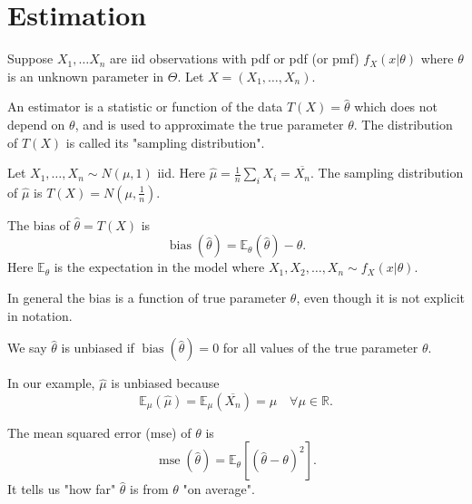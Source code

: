 \documentclass[a4paper]{scrartcl}
\begin{document}
\section{Estimation}
Suppose $X_1 , \ldots X_n$ are iid observations with pdf or pdf (or pmf) $f_{X}(x| \theta)$ where $\theta$ is an unknown parameter in $\Theta$. Let $X=(X_1 , \ldots , X_{n})$. 
\begin{definition*}[Estimator]
     An estimator is a statistic or function of the data $T (X)=\hat{\theta}$ which does not depend on $\theta$, and is used to approximate the true parameter $\theta$. The distribution of $T (X)$ is called its "sampling distribution". 
\end{definition*}
\begin{example*}
     Let $X_1 , \ldots ,X_{n} \sim N (\mu,1)$ iid. Here $\hat{\mu}=\frac{1}{n}\sum_{i}^{}X_{i}=\overline{X_{n}}$. The sampling distribution of $\hat{\mu} $ is $T (X)=N (\mu, \frac{1}{n})$.   
\end{example*}
\begin{definition*}[Bias]
     The bias of $\hat{\theta}=T (X)$ is \[
     \operatorname{bias}(\hat{\theta})=\mathbb{E}_{\theta} (\hat{\theta})-\theta
     .\] Here $\mathbb{E}_{\theta}$ is the expectation in the model where $X_1 , X_2 , \ldots ,X_n \sim f_{X}(x|\theta)$.
\end{definition*}
\begin{remark}
     In general the bias is a function of true parameter $\theta$, even though it is not explicit in notation.  
\end{remark}
\begin{definition*}
     We say $\hat{\theta}$ is unbiased if $\operatorname{bias}(\hat{\theta})=0$ for all values of the true parameter $\theta$. 
\end{definition*}
In our example, $\hat{\mu}$ is unbiased because \[
\mathbb{E}_{\mu}(\hat{\mu})=\mathbb{E}_{\mu}(\overline{X_{n}})=\mu \quad \forall \mu \in \mathbb{R}
.\]  
\begin{definition*}
     The mean squared error (mse) of $\theta$ is \[
     \operatorname{mse}(\hat{\theta})=\mathbb{E}_{\theta} \left[ (\hat{\theta}-\theta)^2\right]
     .\] 
     It tells us "how far" $\hat{\theta}$ is from $\theta$ "on average".
\end{definition*}
\end{document}
